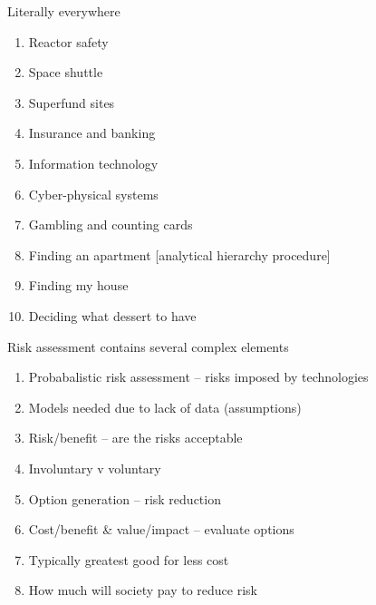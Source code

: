 \documentclass[aspectratio=1610,pdftex,dvipsnames,compress,xcolor={dvipsnames}]{beamer}
\begin{document}
\addtocounter{framenumber}{-1}
\begin{frame}{Literally everywhere}
    \begin{enumerate}[series=outerlist,topsep=0pt,itemsep=11pt,leftmargin=*,label=(\arabic*)]
        \item[]Reactor safety  
        \item[]Space shuttle
        \item[]Superfund sites
        \item[]Insurance and banking
        \item[]Information technology
        \item[]Cyber-physical systems
        \item[]Gambling and counting cards
        \item[]Finding an apartment [analytical hierarchy procedure] 
        \item[]Finding my house  
        \item[]Deciding what dessert to have
    \end{enumerate}
\end{frame}


\begin{frame}{Risk assessment contains several complex elements}
    \begin{enumerate}[series=outerlist,topsep=0pt,itemsep=15pt,leftmargin=*,label=(\arabic*)]
        \item[]Probabalistic risk assessment -- risks imposed by technologies
        \item[]Models needed due to lack of data (assumptions)
        \item[]Risk/benefit -- are the risks acceptable  
        \item[]Involuntary v voluntary
        \item[]Option generation -- risk reduction  
        \item[]Cost/benefit \& value/impact -- evaluate options
        \item[]Typically greatest good for less cost
        \item[]How much will society pay to reduce risk  
    \end{enumerate}
\end{frame}
\end{document}
